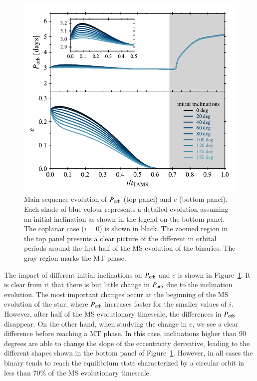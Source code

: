 \documentclass{aa}
\begin{document}
\begin{figure}
   \centering
   \includegraphics[width=\hsize]{figures/orbital_params_evolution_caseA.pdf}
   \caption{Main sequence evolution of $P_{\rm orb}$ (top panel) and $e$ (bottom panel). Each shade of blue colour represents a detailed
      evolution assuming an initial inclination as shown in the legend on the bottom panel. The coplanar case ($i = 0$) is shown in black.
      The zoomed region in the top panel presents a clear picture of the different in orbital periods around the first half of the MS
      evolution of the binaries. The gray region marks the MT phase.}
   \label{fig:orbital_params_evolution_caseA}
\end{figure}

The impact of different initial inclinations on $P_{\rm orb}$ and $e$ is shown in Figure~\ref{fig:orbital_params_evolution_caseA}. It is
clear from it that there is but little change in $P_{\rm orb}$ due to the inclination evolution. The most important changes occur at the
beginning of the MS evolution of the star, where $P_{\rm orb}$ increases faster for the smaller values of $i$. However, after half of the
MS evolutionary timescale, the differences in $P_{\rm orb}$ disappear. On the other hand, when studying the change in $e$, we see a clear
difference before reaching a MT phase. In this case, inclinations higher than 90 degrees are able to change the slope of the eccentricity
derivative, leading to the different shapes shown in the bottom panel of Figure~\ref{fig:orbital_params_evolution_caseA}. However, in all
cases the binary tends to reach the equilibrium state characterized by a circular orbit in less than $70\%$ of the MS evolutionary
timescale.
\end{document}

